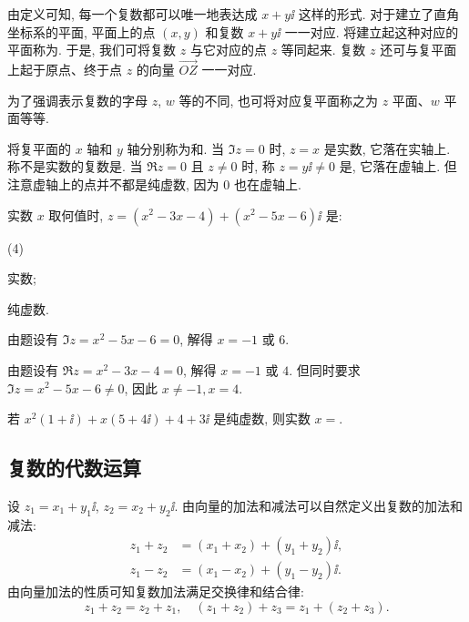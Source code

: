 由定义可知, 每一个复数都可以唯一地表达成 $x+y\ii$ 这样的形式.
对于建立了直角坐标系的平面, 平面上的点 $(x,y)$ 和复数 $x+y\ii$ 一一对应.
将建立起这种对应的平面称为.
于是, 我们可将复数 $z$ 与它对应的点 $z$ 等同起来.
复数 $z$ 还可与复平面上起于原点、终于点 $z$ 的向量 $\overrightarrow{OZ}$ 一一对应.

为了强调表示复数的字母 $z$, $w$ 等的不同, 也可将对应复平面称之为 $z$ 平面、$w$ 平面等等.

将复平面的 $x$ 轴和 $y$ 轴分别称为和.
当 $\Im z=0$ 时, $z=x$ 是实数, 它落在实轴上.
称不是实数的复数是.
当 $\Re z=0$ 且 $z\neq 0$ 时, 称 $z=y\ii\neq 0$ 是, 它落在虚轴上.
但注意虚轴上的点并不都是纯虚数, 因为 $0$ 也在虚轴上.

\begin{example}
  实数 $x$ 取何值时, $z=(x^2-3x-4)+(x^2-5x-6)\ii$ 是:
  \begin{subexample}(4)
    \item 实数;
    \item 纯虚数.
  \end{subexample}
\end{example}

\begin{solutionenum}
  \item 由题设有 $\Im z=x^2-5x-6=0$, 解得 $x=-1$ 或 $6$.
  \item 由题设有 $\Re z=x^2-3x-4=0$, 解得 $x=-1$ 或 $4$.
  但同时要求 $\Im z=x^2-5x-6\neq 0$, 因此 $x\neq -1, x=4$.
\end{solutionenum}

\begin{exercise}
  若 $x^2(1+\ii)+x(5+4\ii)+4+3\ii$ 是纯虚数, 则实数 $x=$\fillblank{}.
\end{exercise}


\subsection{复数的代数运算}

设 $z_1=x_1+y_1\ii$, $z_2=x_2+y_2\ii$.
由向量的加法和减法可以自然定义出复数的加法和减法:
\begin{align*}
  z_1+z_2&=(x_1+x_2)+(y_1+y_2)\ii,\\
  z_1-z_2&=(x_1-x_2)+(y_1-y_2)\ii.
\end{align*}
由向量加法的性质可知复数加法满足交换律和结合律:
\[
  z_1+z_2=z_2+z_1,\quad (z_1+z_2)+z_3=z_1+(z_2+z_3).
\]

